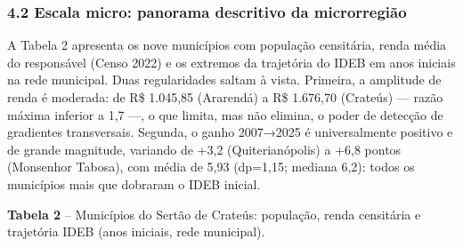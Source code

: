 \documentclass[
  brazilian,
  12pt,
  a4paper,
]{article}
\begin{document}
\subsubsection{4.2 Escala micro: panorama descritivo da
microrregião}\label{escala-micro-panorama-descritivo-da-microrregiuxe3o}

A Tabela 2 apresenta os nove municípios com população censitária, renda
média do responsável (Censo 2022) e os extremos da trajetória do IDEB em
anos iniciais na rede municipal. Duas regularidades saltam à vista.
Primeira, a amplitude de renda é moderada: de R\$ 1.045,85 (Ararendá) a
R\$ 1.676,70 (Crateús) --- razão máxima inferior a 1,7 ---, o que
limita, mas não elimina, o poder de detecção de gradientes transversais.
Segunda, o ganho 2007→2025 é universalmente positivo e de grande
magnitude, variando de +3,2 (Quiterianópolis) a +6,8 pontos (Monsenhor
Tabosa), com média de 5,93 (dp=1,15; mediana 6,2): todos os municípios
mais que dobraram o IDEB inicial.

\textbf{Tabela 2} -- Municípios do Sertão de Crateús: população, renda
censitária e trajetória IDEB (anos iniciais, rede municipal).
\end{document}
